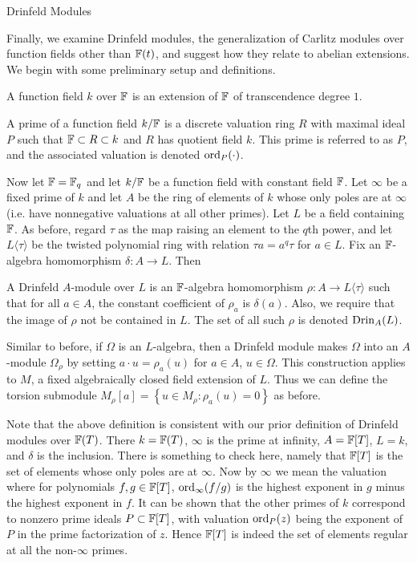 \documentclass[12pt]{article}
\begin{document}
\begin{section}{Drinfeld Modules}

Finally, we examine Drinfeld modules, the generalization of Carlitz
modules over function fields other than ${\mathbb F}(t)$, and suggest how they
relate to abelian extensions.  We begin with some preliminary setup and
definitions.

\begin{definition}
A function field $k$ over ${\mathbb F}$ is an extension of ${\mathbb F}$ of transcendence
degree $1$.
\end{definition}
\begin{definition}
A prime of a function field $k/{\mathbb F}$ is a discrete valuation ring $R$
with maximal ideal $P$ such that ${\mathbb F} \subset R \subset k$ and $R$ has
quotient field $k$.  This prime is referred to as $P$, and the associated
valuation is denoted $\operatorname{ord}_P(\cdot)$.
\end{definition}

Now let ${\mathbb F} = {\mathbb F}_q$ and let $k/{\mathbb F}$ be a function field with constant field
${\mathbb F}$.  Let $\infty$ be a fixed prime of $k$ and let $A$ be the ring of
elements of $k$ whose only poles are at $\infty$ (i.e. have nonnegative
valuations at all other primes).  Let $L$ be a field containing ${\mathbb F}$.  As
before, regard $\tau$ as the map raising an element to the $q$th power,
and let $L\langle\tau\rangle$ be the twisted polynomial ring with relation
$\tau a = a^q\tau$ for $a \in L$.  Fix an ${\mathbb F}$-algebra homomorphism
$\delta: A \rightarrow L$.  Then
\begin{definition}
A Drinfeld $A$-module over $L$ is an ${\mathbb F}$-algebra homomorphism
$\rho: A \rightarrow L\langle\tau\rangle$ such that for all $a \in A$,
the constant coefficient of $\rho_a$ is $\delta(a)$.  Also, we require
that the image of $\rho$ not be contained in $L$.  The set of all such
$\rho$ is denoted $\operatorname{Drin}_A(L)$.
\end{definition}

Similar to before, if $\Omega$ is an $L$-algebra, then a Drinfeld module
makes $\Omega$ into an $A$-module $\Omega_\rho$ by setting
$a\cdot u = \rho_a(u)$ for $a \in A$, $u \in \Omega$.  This construction
applies to $M$, a fixed algebraically closed field extension of $L$.  Thus
we can define the torsion submodule $M_\rho[a] = \left\{u \in M_\rho:
\rho_a(u) = 0 \right\}$ as before.

Note that the above definition is consistent with our prior definition of
Drinfeld modules over ${\mathbb F}(T)$.  There $k = {\mathbb F}(T)$, $\infty$ is the prime at
infinity, $A = {\mathbb F}[T]$, $L = k$, and $\delta$ is the inclusion.  There is
something to check here, namely that ${\mathbb F}[T]$ is the set of elements whose
only poles are at $\infty$.  Now by $\infty$ we mean the valuation where
for polynomials $f,g\in {\mathbb F}[T]$, $\operatorname{ord}_\infty(f/g)$ is the highest exponent
in $g$ minus the highest exponent in $f$.  It can be shown that the other
primes of $k$ correspond to nonzero prime ideals $P \subset {\mathbb F}[T]$, with
valuation $\operatorname{ord}_P(z)$ being the exponent of $P$ in the prime factorization
of $z$.  Hence ${\mathbb F}[T]$ is indeed the set of elements regular at all the
non-$\infty$ primes.


\end{section}
\end{document}
